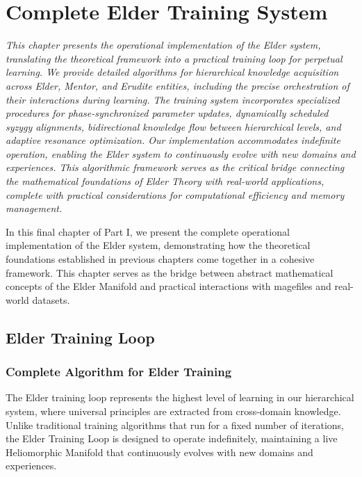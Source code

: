 \chapter{Complete Elder Training System}

\textit{This chapter presents the operational implementation of the Elder system, translating the theoretical framework into a practical training loop for perpetual learning. We provide detailed algorithms for hierarchical knowledge acquisition across Elder, Mentor, and Erudite entities, including the precise orchestration of their interactions during learning. The training system incorporates specialized procedures for phase-synchronized parameter updates, dynamically scheduled syzygy alignments, bidirectional knowledge flow between hierarchical levels, and adaptive resonance optimization. Our implementation accommodates indefinite operation, enabling the Elder system to continuously evolve with new domains and experiences. This algorithmic framework serves as the critical bridge connecting the mathematical foundations of Elder Theory with real-world applications, complete with practical considerations for computational efficiency and memory management.}

In this final chapter of Part I, we present the complete operational implementation of the Elder system, demonstrating how the theoretical foundations established in previous chapters come together in a cohesive framework. This chapter serves as the bridge between abstract mathematical concepts of the Elder Manifold and practical interactions with magefiles and real-world datasets.

\section{Elder Training Loop}

\subsection{Complete Algorithm for Elder Training}

The Elder training loop represents the highest level of learning in our hierarchical system, where universal principles are extracted from cross-domain knowledge. Unlike traditional training algorithms that run for a fixed number of iterations, the Elder Training Loop is designed to operate indefinitely, maintaining a live Heliomorphic Manifold that continuously evolves with new domains and experiences.

